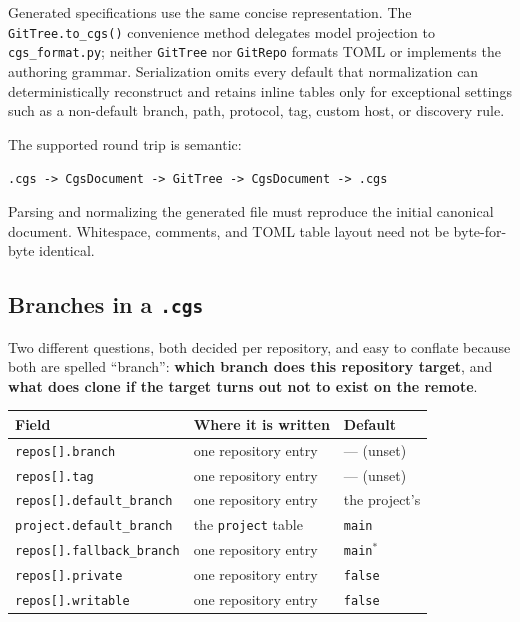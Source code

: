 Generated specifications use the same concise representation. The
\texttt{GitTree.to\_cgs()} convenience method delegates model projection to
\texttt{cgs\_format.py}; neither \texttt{GitTree} nor \texttt{GitRepo} formats
TOML or implements the authoring grammar. Serialization omits every default
that normalization can deterministically reconstruct and retains inline tables
only for exceptional settings such as a non-default branch, path, protocol,
tag, custom host, or discovery rule.

The supported round trip is semantic:

\begin{center}
\texttt{.cgs -> CgsDocument -> GitTree -> CgsDocument -> .cgs}
\end{center}

Parsing and normalizing the generated file must reproduce the initial
canonical document. Whitespace, comments, and TOML table layout need not be
byte-for-byte identical.

\subsection{Branches in a \texttt{.cgs}}

Two different questions, both decided per repository, and easy to conflate
because both are spelled ``branch'': \textbf{which branch does this
repository target}, and \textbf{what does \cgscli{} clone if the target
turns out not to exist on the remote}.

\begin{center}
\begin{tabular}{lll}
\textbf{Field} & \textbf{Where it is written} & \textbf{Default} \\
\hline
\texttt{repos[].branch}           & one repository entry & --- (unset) \\
\texttt{repos[].tag}              & one repository entry & --- (unset) \\
\texttt{repos[].default\_branch}  & one repository entry & the project's \\
\texttt{project.default\_branch}  & the \texttt{project} table & \texttt{main} \\
\texttt{repos[].fallback\_branch} & one repository entry & \texttt{main}${}^{*}$ \\
\texttt{repos[].private}           & one repository entry & \texttt{false} \\
\texttt{repos[].writable}         & one repository entry & \texttt{false} \\
\end{tabular}
\end{center}


